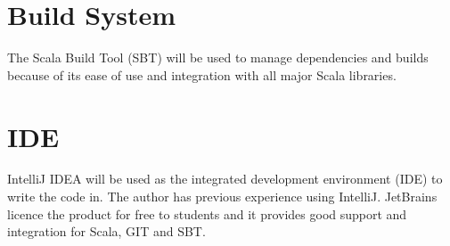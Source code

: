 	\section{Build System}
		The Scala Build Tool (SBT) will be used to manage dependencies and builds because of its ease of use and integration with all major Scala libraries.
	\section{IDE}
		IntelliJ IDEA \cite{Intellij} will be used as the integrated development environment (IDE) to write the code in. The author has previous experience using IntelliJ. JetBrains licence the product for free to students and it provides good support and integration for Scala, GIT and SBT.
	 
